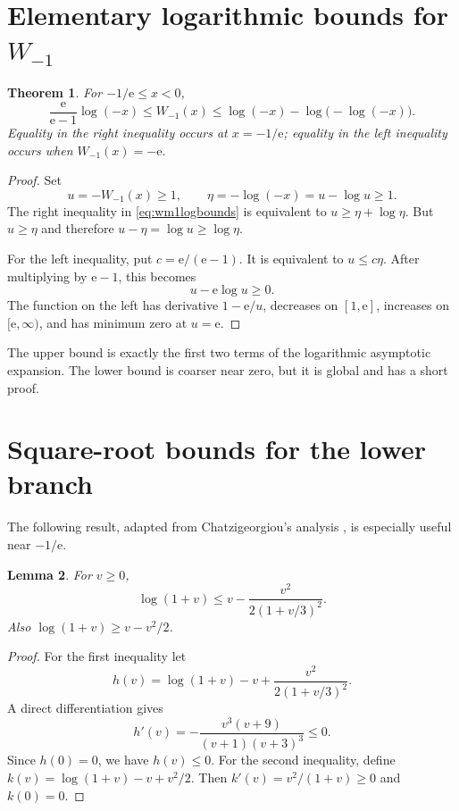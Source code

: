 \documentclass[11pt,oneside]{book}
\newtheorem{theorem}{Theorem}[chapter]
\newtheorem{lemma}[theorem]{Lemma}
\theoremstyle{definition}
\theoremstyle{remark}
\newcommand{\ee}{\mathrm e}
\begin{document}
\section{Elementary logarithmic bounds for $W_{-1}$}

\begin{theorem}\label{thm:wm1logbounds}
For $-1/\ee\le x<0$,
\begin{equation}\label{eq:wm1logbounds}
 \frac{\ee}{\ee-1}\log(-x)
 \le W_{-1}(x)
 \le \log(-x)-\log\bigl(-\log(-x)\bigr).
\end{equation}
Equality in the right inequality occurs at $x=-1/\ee$; equality in the left
inequality occurs when $W_{-1}(x)=-\ee$.
\end{theorem}

\begin{proof}
Set
\[
 u=-W_{-1}(x)\ge1,
 \qquad
 \eta=-\log(-x)=u-\log u\ge1.
\]
The right inequality in \eqref{eq:wm1logbounds} is equivalent to
$u\ge\eta+\log\eta$.  But $u\ge\eta$ and therefore
$u-\eta=\log u\ge\log\eta$.

For the left inequality, put $c=\ee/(\ee-1)$.  It is equivalent to
$u\le c\eta$.  After multiplying by $\ee-1$, this becomes
\[
 u-\ee\log u\ge0.
\]
The function on the left has derivative $1-\ee/u$, decreases on $[1,\ee]$,
increases on $[\ee,\infty)$, and has minimum zero at $u=\ee$.
\end{proof}

The upper bound is exactly the first two terms of the logarithmic asymptotic
expansion.  The lower bound is coarser near zero, but it is global and has a
short proof.

\section{Square-root bounds for the lower branch}

The following result, adapted from Chatzigeorgiou's analysis
\cite{chatzigeorgiou2013}, is especially useful near $-1/\ee$.

\begin{lemma}\label{lem:logrationalupper}
For $v\ge0$,
\begin{equation}\label{eq:logrationalupper}
 \log(1+v)
 \le v-\frac{v^2}{2(1+v/3)^2}.
\end{equation}
Also $\log(1+v)\ge v-v^2/2$.
\end{lemma}

\begin{proof}
For the first inequality let
\[
 h(v)=\log(1+v)-v+\frac{v^2}{2(1+v/3)^2}.
\]
A direct differentiation gives
\[
 h'(v)=-\frac{v^3(v+9)}{(v+1)(v+3)^3}\le0.
\]
Since $h(0)=0$, we have $h(v)\le0$.  For the second inequality, define
$k(v)=\log(1+v)-v+v^2/2$.  Then
$k'(v)=v^2/(1+v)\ge0$ and $k(0)=0$.
\end{proof}
\end{document}
